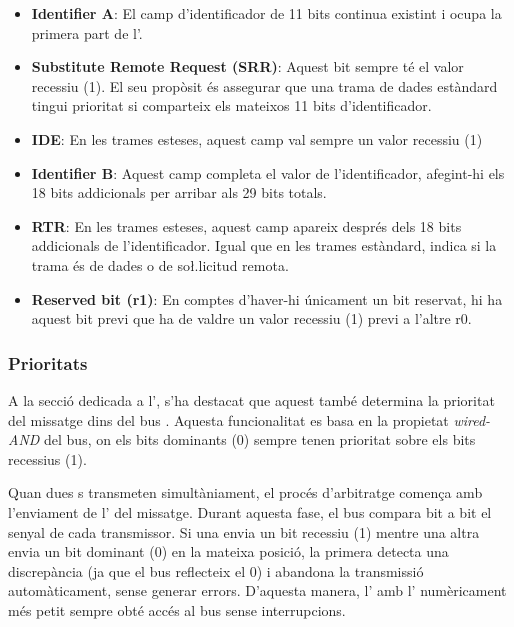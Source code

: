 \documentclass{tfgitic}[2024/07/01]
\begin{document}
\begin{itemize}
  \item \textbf{Identifier A}: El camp d'identificador de 11 bits continua existint i ocupa la primera part de l'.

  \item \textbf{Substitute Remote Request (SRR)}: Aquest bit sempre té el valor recessiu (1). El seu propòsit és assegurar 
  que una trama de dades estàndard tingui prioritat si comparteix els mateixos 11 bits d'identificador.

  \item \textbf{IDE}: En les trames esteses, aquest camp val sempre un valor recessiu (1)

  \item \textbf{Identifier B}: Aquest camp completa el valor de l'identificador, afegint-hi els 18 bits addicionals per arribar als 29 bits totals.

  \item \textbf{RTR}: En les trames esteses, aquest camp apareix després dels 18 bits addicionals de l'identificador. 
  Igual que en les trames estàndard, indica si la trama és de dades o de so\l.licitud remota.

  \item \textbf{Reserved bit (r1)}: En comptes d'haver-hi únicament un bit reservat, hi ha aquest bit previ que ha de valdre un valor recessiu (1) previ a l'altre r0.

\end{itemize} 

\subsubsection{Prioritats}

A la secció dedicada a l', s'ha destacat que aquest també determina la prioritat del missatge dins del bus . Aquesta funcionalitat 
es basa en la propietat \textit{wired-AND} del bus, on els bits dominants (0) sempre tenen prioritat sobre els bits recessius (1).

Quan dues s transmeten simultàniament, el procés d'arbitratge comença amb l'enviament de l' del missatge. Durant aquesta fase, el bus compara bit a bit 
el senyal de cada transmissor. Si una  envia un bit recessiu (1) mentre una altra envia un bit dominant (0) en la mateixa posició, la primera detecta una 
discrepància (ja que el bus reflecteix el 0) i abandona la transmissió automàticament, sense generar errors. D'aquesta manera, l' amb l' numèricament més 
petit sempre obté accés al bus sense interrupcions.
\end{document}
